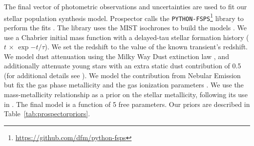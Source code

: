 \documentclass[twocolumn]{aastex63}
\begin{document}
The final vector of photometric observations and uncertainties are used to fit our stellar population synthesis model. Prospector calls the \texttt{PYTHON-FSPS}\footnote{\url{https://github.com/dfm/python-fsps}} library to perform the fits \citep{Conroy_2009_FSPS,Conroy_2010_FSPS}. The library uses the MIST isochrones to build the models \citep{Choi_2016_MIST,Dotter_2016_MIST}. We use a Chabrier initial mass function \citep{Chabrier2003} with a delayed-tau stellar formation history ($t$ $\times$ $\exp{-t/\tau}$). We set the redshift to the value of the known transient's redshift. We model dust attenuation using the Milky Way Dust extinction law \citep{MWExtinction}, and additionally attenuate young stars with an extra static dust contribution of 0.5 (for additional details see \citealt{Conroy_2009_FSPS}).
We model the contribution from Nebular Emission but fix the gas phase metallicity and the gas ionization parameters \citep{BylerNebularEmission2017}. We use the \cite{Gallazzi2005} mass-metallicity relationship as a prior on the stellar metallicity, following its use in \cite{RecentAnyaNugent23}. 
The final model is a function of 5 free parameters. Our priors are described in Table~\ref{tab:prospectorpriors}.


\end{document}

